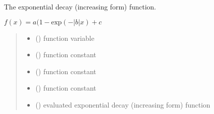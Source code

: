 \documentclass[letterpaper,10pt,english]{sphinxmanual}
\begin{document}

\begin{fulllineitems}
\label{\detokenize{01_utils:skinoptics.utils.exp_decay_inc_form}}
\pysigstartsignatures
{}
\pysigstopsignatures
\sphinxAtStartPar
The exponential decay (increasing form) function.

\sphinxAtStartPar
\(f(x) = a(1 - \mbox{exp}(-|b|x) + c\)
\begin{quote}\begin{description}
\begin{itemize}
\item {} 
\sphinxAtStartPar
{} () \textendash{} function variable

\item {} 
\sphinxAtStartPar
{} () \textendash{} function constant

\item {} 
\sphinxAtStartPar
{} () \textendash{} function constant

\item {} 
\sphinxAtStartPar
{} () \textendash{} function constant

\end{itemize}

\sphinxAtStartPar
\begin{itemize}
\item {} 
\sphinxAtStartPar
{} () \textendash{} evaluated exponential decay (increasing form) function

\end{itemize}


\end{description}\end{quote}

\end{fulllineitems}
\end{document}
